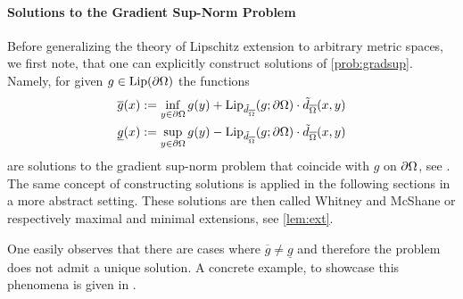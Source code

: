 \paragraph{Solutions to the Gradient Sup-Norm Problem} Before generalizing the theory of Lipschitz extension to arbitrary metric spaces, we first note, that one can explicitly construct solutions of \cref{prob:gradsup}. Namely, for given $g\in\operatorname{Lip}(\partial\Omega)$ the functions 
%
\begin{align}\label{eq:JenSol}
\begin{aligned}
\overline{g}(x) &:= \inf_{y\in\partial\domain} g(y) + 
\Lip_{\tilde{d}_{\overline{\domain}}}(g; \partial\domain)\cdot \tilde{d}_{\overline{\domain}}(x,y)\\
%
\underline{g}(x) &:= \sup_{y\in\partial\domain} g(y) - 
\Lip_{\tilde{d}_{\overline{\domain}}}(g; \partial\domain)\cdot \tilde{d}_{\overline{\domain}}(x,y)
\end{aligned}
\end{align}
%
are solutions to the gradient sup-norm problem that coincide with $g$ on $\partial\Omega$, see \cite[Th. 1.8]{jensen1993uniqueness}. The same concept of constructing solutions is applied in the following sections in a more abstract setting. 
These solutions are then called Whitney and McShane or respectively maximal and minimal extensions, see 
\cref{lem:ext}.

One easily observes that there are cases where $\overline{g}\neq \underline{g}$ and therefore the problem does not admit a unique solution. A concrete example, to showcase this phenomena is given in \cite[p. 53]{jensen1993uniqueness}.
%
%

